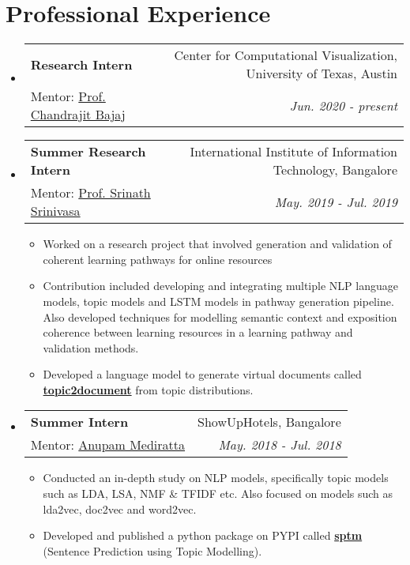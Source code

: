 \documentclass[a4paper,11pt]{article}
\makeatletter
\newcommand{\resumeItemSingle}[1]{
    \vspace{-2pt}\item\small{
        {#1}
    }
}
\newcommand{\resumeSubheading}[4]{
    \item
        \begin{tabular*}{0.97\textwidth}{l@{\extracolsep{\fill}}r}
            \textbf{#1} & #2 \\
            \small#3 & \textit{\small #4} \\
        \end{tabular*}\vspace{-5pt}
}
\newcommand{\resumeSubHeadingListStart}{\begin{itemize}[leftmargin=*]}
\newcommand{\resumeSubHeadingListEnd}{\end{itemize}}
\newcommand{\resumeItemListStart}{\begin{itemize}}
\newcommand{\resumeItemListEnd}{\end{itemize}\vspace{-5pt}}
\makeatother
\begin{document}
\section{Professional Experience}
    \resumeSubHeadingListStart
        \resumeSubheading
            {Research Intern}{Center for Computational Visualization, University of Texas, Austin}
            {Mentor: \href{http://www.cs.utexas.edu/~bajaj/cvc/}{Prof. Chandrajit Bajaj}}{Jun. 2020 - present}

        \resumeSubheading
        {Summer Research Intern}{International Institute of Information Technology, Bangalore}
            {Mentor: \href{https://www.iiitb.ac.in/faculty/srinath-srinivasa}{Prof. Srinath Srinivasa}}{May. 2019 - Jul. 2019}
            \resumeItemListStart
                \resumeItemSingle{Worked on a research project that involved generation and validation of coherent learning pathways for online resources}
                \resumeItemSingle{Contribution included developing and integrating multiple NLP language models, topic models and LSTM models in pathway generation pipeline. Also developed techniques for modelling semantic context and exposition coherence between learning resources in a learning pathway and validation methods.}
                \resumeItemSingle{Developed a language model to generate virtual documents called \textbf{\href{https://github.com/Rochan-A/topic2document}{topic2document}} from topic distributions.}
            \resumeItemListEnd

        \resumeSubheading
        {Summer Intern}{ShowUpHotels, Bangalore}
            {Mentor: \href{https://in.linkedin.com/in/anupam-mediratta-60b5547}{Anupam Mediratta}}{May. 2018 - Jul. 2018}
            \resumeItemListStart
                \resumeItemSingle{Conducted an in-depth study on NLP models, specifically topic models such as LDA, LSA, NMF \& TFIDF etc. Also focused on models such as lda2vec, doc2vec and word2vec.}
                \resumeItemSingle{Developed and published a python package on PYPI called \textbf{\href{https://github.com/Rochan-A/sptm}{sptm}} (Sentence Prediction using Topic Modelling).}
            \resumeItemListEnd
    \resumeSubHeadingListEnd
\end{document}
